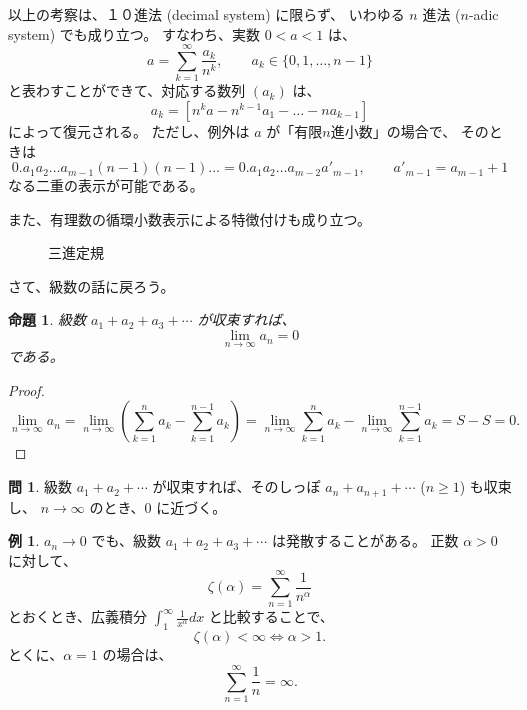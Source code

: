 \documentclass[a4paper]{jsarticle}
\newtheorem{Proposition}[Theorem]{命題}
\theoremstyle{definition}
\newtheorem{Example}[Theorem]{例}
\newtheorem{Exercise}{問}%
\theoremstyle{remark}
\begin{document}
以上の考察は、１０進法 (decimal system) に限らず、
いわゆる $n$ 進法 ($n$-adic system) でも成り立つ。
すなわち、実数 $0 < a < 1$ は、
\[
a = \sum_{k=1}^\infty \frac{a_k}{n^k}, 
\qquad a_k \in \{ 0, 1, \dots, n-1\}
\]
と表わすことができて、対応する数列 $(a_k)$ は、
\[
a_k = [n^ka - n^{k-1}a_1 - \dots - na_{k-1}]
\]
によって復元される。
ただし、例外は $a$ が「有限$n$進小数」の場合で、
そのときは
\[
0.a_1a_2\dots a_{m-1} (n-1) (n-1) \dots 
= 0.a_1a_2\dots a_{m-2} a'_{m-1},
\qquad 
a'_{m-1} = a_{m-1} + 1
\]
なる二重の表示が可能である。

また、有理数の循環小数表示による特徴付けも成り立つ。

\begin{figure}[h]
\begin{center}

\end{center}
\caption{三進定規}
\label{ruler}
\end{figure}

% 

さて、級数の話に戻ろう。

\begin{Proposition}
級数 $a_1 + a_2 + a_3 + \cdots$ が収束すれば、
\[
\lim_{n\to \infty} a_n = 0
\]
である。
\end{Proposition}

\begin{proof}
\[ 
\lim_{n \to \infty} a_n = \lim_{n \to \infty} \left( \sum_{k=1}^n a_k - \sum_{k=1}^{n-1} a_k \right) 
= \lim_{n \to \infty} \sum_{k=1}^n a_k - \lim_{n \to \infty} \sum_{k=1}^{n-1} a_k  
= S - S = 0. 
\]
\end{proof}

\begin{Exercise}
  級数 $a_1 + a_2 + \cdots$ が収束すれば、そのしっぽ $a_n + a_{n+1} + \cdots$ ($n \geq 1$) も収束し、
  $n \to \infty$ のとき、$0$ に近づく。
\end{Exercise}

\begin{Example}
$a_n \to 0$ でも、級数 $a_1 + a_2 + a_3 + \cdots$ は発散することがある。
正数 $\alpha>0$ に対して、
\[
\zeta(\alpha) = \sum_{n =1}^\infty \frac{1}{n^\alpha}
\]
とおくとき、広義積分 $\displaystyle \int_1^\infty \frac{1}{x^\alpha} dx$ と比較することで、
\[
\zeta(\alpha) < \infty 
\iff \alpha > 1. 
\]
とくに、$\alpha = 1$ の場合は、
\[
\sum_{n=1}^\infty \frac{1}{n} = \infty.
\]
\end{Example}
\end{document}
